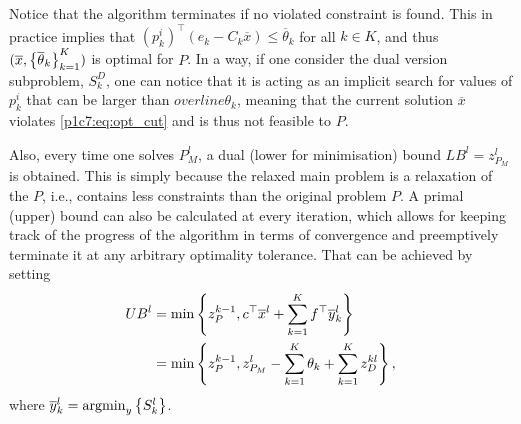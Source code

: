 Notice that the algorithm terminates if no violated constraint is found. This in practice implies that $(p^i_k)^\top(e_k - C_k \overline{x}) \leq \overline{\theta}_k$ for all $k \in K$, and thus $(\overline{x}, \left\{ \overline{\theta}_k \right \}_{k=1}^K)$ is optimal for $P$. In a way, if one consider the dual version subproblem, $S_k^D$, one can notice that it is acting as an implicit search for values of $p^i_k$ that can be larger than $overline{\theta}_k$, meaning that the current solution $\overline{x}$ violates \ref{p1c7:eq:opt_cut} and is thus not feasible to $P$. 

Also, every time one solves $P_M^l$, a dual (lower for minimisation) bound $LB^l = z_{P_M}^l$ is obtained. This is simply because the relaxed main problem is a relaxation of the $P$, i.e., contains less constraints than the original problem $P$. A primal (upper) bound can also be calculated at every iteration, which allows for keeping track of the progress of the algorithm in terms of convergence and preemptively terminate it at any arbitrary optimality tolerance. That can be achieved by setting
%
\begin{align*}
	UB^l &= \min\left\{ z_P^{k-1}, c^\top \overline{x}^l + \sum_{k=1}^K f^\top \overline{y}_k^l \right \} \\	
	&= \min\left\{ z_P^{k-1}, z_{P_M}^l - \sum_{k=1}^K \theta_k + \sum_{k=1}^K z_D^{kl} \right \},
\end{align*}
%
where $\overline{y}_k^l = \mathop{\rm argmin}_y \left\{ S_k^l \right \}$. 


